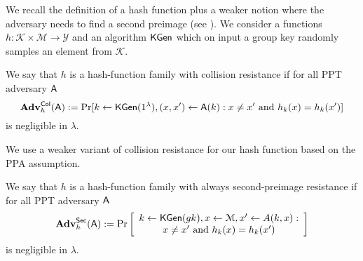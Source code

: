 
We recall the definition of a hash function plus a weaker notion where the adversary needs to find a second preimage (see \cite{FSE:RogShr04}). We consider a functions $h:\mathcal{K}\times\mathcal{M}\to\mathcal{Y}$ and an algorithm $\mathsf{KGen}$ which on input a group key randomly samples an element from $\mathcal{K}$.

\begin{definition}\label{def:hash1}
 We say that $h$ is a hash-function family with collision resistance if for all PPT adversary $\mathsf{A}$
$$
\mathbf{Adv}_h^{\mathsf{Col}}(\mathsf{A}) := \Pr[k\gets\mathsf{KGen}(1^\lambda), (x,x')\gets \mathsf{A}(k):x\neq x'\text{ and }h_k(x)=h_k(x')]
$$ 
is negligible in $\lambda$.
\label{def:collision-resistance}
\end{definition}

We use a weaker variant of collision resistance for our hash function based on the PPA assumption.

\begin{definition}\label{def:hash2}
 We say that $h$ is a hash-function family with always second-preimage resistance if for all PPT adversary $\mathsf{A}$
$$
\mathbf{Adv}_h^{\mathsf{Sec}}(\mathsf{A}) := \Pr\left[\begin{array}{c}
k\gets\mathsf{KGen}(gk), x\gets\mathcal{M}, x'\gets A(k,x):\\
 x\neq x'\text{ and }h_k(x)=h_k(x')
 \end{array}\right]
$$ 
is negligible in $\lambda$.
\end{definition}
%
